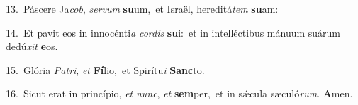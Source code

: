 {\numbfont\textcolor{\numbcolor}{13.}}~Páscere Ja\-\textit{cob}\-, \textit{ser}\-\textit{vum} \textbf{su}\-um,~\star et Israël, hereditá\textit{tem} \textbf{su}\-am:\par
{\numbfont\textcolor{\numbcolor}{14.}}~Et pavit eos in innocénti\textit{a} \textit{cor}\-\textit{dis} \textbf{su}\-i:~\star et in intelléctibus mánuum suárum dedú\textit{xit} \textbf{e}\-os.\par
{\numbfont\textcolor{\numbcolor}{15.}}~Glória \textit{Pa}\-\textit{tri}, \textit{et} \textbf{Fí}\-lio,~\star et Spirítu\textit{i} \textbf{Sanc}\-to.\par
{\numbfont\textcolor{\numbcolor}{16.}}~Sicut erat in princípio, \textit{et} \textit{nunc}\-, \textit{et} \textbf{sem}\-per,~\star et in sǽcula sæculó\-\textit{rum}\-. \textbf{A}\-men.\par
